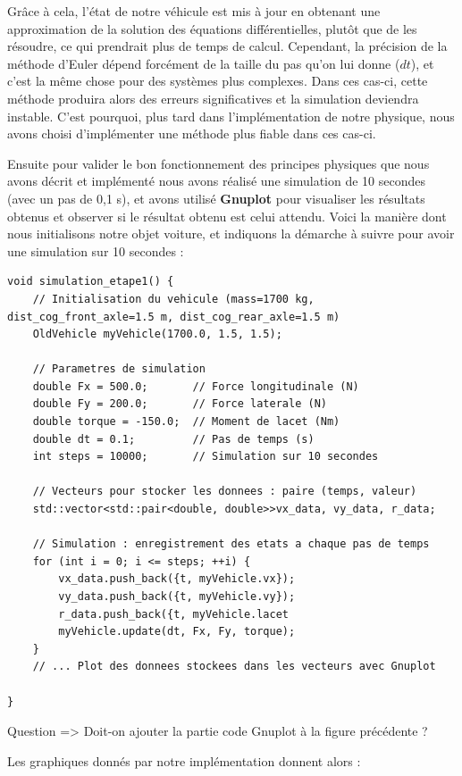 \documentclass[a4paper,12pt]{report}
\begin{document}
    Grâce à cela, l'état de notre véhicule est mis à jour en obtenant une approximation de la solution des équations différentielles, plutôt que de les résoudre, ce qui prendrait plus de temps de calcul.
    Cependant, la précision de la méthode d'Euler dépend forcément de la taille du pas qu'on lui donne ($dt$), et c'est la même chose pour des systèmes plus complexes. Dans ces cas-ci, cette méthode produira alors des erreurs significatives et la simulation deviendra instable. C'est pourquoi, plus tard dans l'implémentation de notre physique, nous avons choisi d'implémenter une méthode plus fiable dans ces cas-ci.

    Ensuite pour valider le bon fonctionnement des principes physiques que nous avons décrit et implémenté nous avons réalisé une simulation de 10 secondes (avec un pas de 0,1 s), et avons utilisé \textbf{Gnuplot} pour visualiser les résultats obtenus et observer si le résultat obtenu est celui attendu. Voici la manière dont nous initialisons notre objet voiture, et indiquons la démarche à suivre pour avoir une simulation sur 10 secondes :
    \begin{lstlisting}[style=CStyle]
void simulation_etape1() {
    // Initialisation du vehicule (mass=1700 kg, dist_cog_front_axle=1.5 m, dist_cog_rear_axle=1.5 m)
    OldVehicle myVehicle(1700.0, 1.5, 1.5);

    // Parametres de simulation
    double Fx = 500.0;       // Force longitudinale (N)
    double Fy = 200.0;       // Force laterale (N)
    double torque = -150.0;  // Moment de lacet (Nm)
    double dt = 0.1;         // Pas de temps (s)
    int steps = 10000;       // Simulation sur 10 secondes

    // Vecteurs pour stocker les donnees : paire (temps, valeur)
    std::vector<std::pair<double, double>>vx_data, vy_data, r_data;

    // Simulation : enregistrement des etats a chaque pas de temps
    for (int i = 0; i <= steps; ++i) {
        vx_data.push_back({t, myVehicle.vx});
        vy_data.push_back({t, myVehicle.vy});
        r_data.push_back({t, myVehicle.lacet
        myVehicle.update(dt, Fx, Fy, torque);
    }
    // ... Plot des donnees stockees dans les vecteurs avec Gnuplot

}
    \end{lstlisting}

    {\LARGE Question => Doit-on ajouter la partie code Gnuplot à la figure précédente ?}

    Les graphiques donnés par notre implémentation donnent alors :
\end{document}
